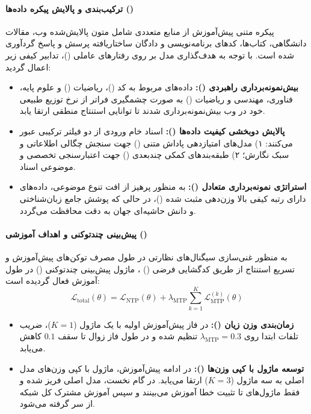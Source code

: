\paragraph*{ترکیب‌بندی و پالایش پیکره داده‌ها ()}
پیکره متنی پیش‌آموزش از منابع متعددی شامل متون پالایش‌شده وب، مقالات دانشگاهی، کتاب‌ها، کدهای برنامه‌نویسی و دادگان ساختاریافته پرسش و پاسخ گردآوری شده است. با توجه به هدف‌گذاری مدل بر روی رفتارهای عاملی ()، تدابیر کیفی زیر اعمال گردید:
\begin{itemize}
    \item \textbf{بیش‌نمونه‌برداری راهبردی ():} داده‌های مربوط به کد ()، ریاضیات () و علوم پایه، فناوری، مهندسی و ریاضیات () به صورت چشمگیری فراتر از نرخ توزیع طبیعی خود در وب بیش‌نمونه‌برداری شدند تا توانایی استنتاج منطقی ارتقا یابد.
    \item \textbf{پالایش دوبخشی کیفیت داده‌ها ():} اسناد خام ورودی از دو فیلتر ترکیبی عبور می‌کنند: ۱) مدل‌های امتیازدهی پاداش متنی () جهت سنجش چگالی اطلاعاتی و سبک نگارش؛ ۲) طبقه‌بندهای کمکی چندبعدی () جهت اعتبارسنجی تخصصی و موضوعی اسناد.
    \item \textbf{استراتژی نمونه‌برداری متعادل ():} به منظور پرهیز از افت تنوع موضوعی، داده‌های دارای رتبه کیفی بالا وزن‌دهی مثبت شده ()، در حالی که پوشش جامع زبان‌شناختی و دانش حاشیه‌ای جهان به دقت محافظت می‌گردد.
\end{itemize}

\paragraph*{پیش‌بینی چندتوکنی و اهداف آموزشی ()}
به منظور غنی‌سازی سیگنال‌های نظارتی در طول مصرف توکن‌های پیش‌آموزش و تسریع استنتاج از طریق کدگشایی فرضی () \cite{leviathan2023fast}، ماژول پیش‌بینی چندتوکنی () \cite{gloeckle2024better, deepseek2024v3} در طول آموزش فعال گردیده است:
\begin{equation}
    \mathcal{L}_{\text{total}}(\theta) = \mathcal{L}_{\text{NTP}}(\theta) + \lambda_{\text{MTP}} \sum_{k=1}^{K} \mathcal{L}_{\text{MTP}}^{(k)}(\theta)
\end{equation}
\begin{itemize}
    \item \textbf{زمان‌بندی وزن زیان ():} در فاز پیش‌آموزش اولیه با یک ماژول ($K=1$)، ضریب تلفات ابتدا روی $\lambda_{\text{MTP}} = 0.3$ تنظیم شده و در طول فاز زوال تا سقف $0.1$ کاهش می‌یابد.
    \item \textbf{توسعه ماژول با کپی وزن‌ها ():} در ادامه پیش‌آموزش، ماژول  با کپی وزن‌های مدل اصلی به سه ماژول ($K=3$) ارتقا می‌یابد. در گام نخست، مدل اصلی فریز شده و فقط ماژول‌های  تا تثبیت خطا آموزش می‌بینند و سپس آموزش مشترک کل شبکه از سر گرفته می‌شود.
\end{itemize}

